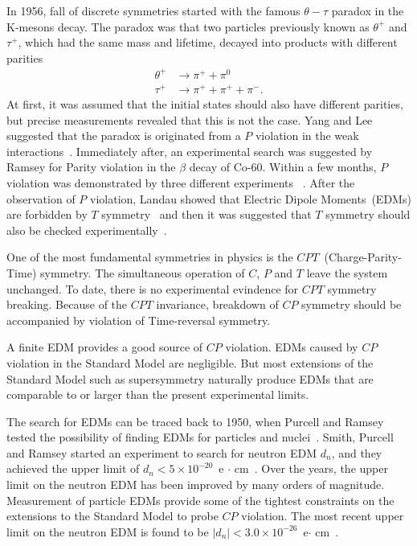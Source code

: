 In 1956, fall of discrete symmetries started with the famous
$\theta-\tau$ paradox in the K-mesons decay. The paradox was that two
particles previously known as $\theta^+$ and $\tau^+$, which had the
same mass and lifetime, decayed into products with different parities
\begin{equation}
  \begin{split}
    \theta^+ &\rightarrow \pi^+ + \pi^0 \\
    \tau^+ &\rightarrow \pi^+ + \pi^+ + \pi^-.
  \end{split}
\end{equation}
At first, it was assumed that the initial states should also have
different parities, but precise measurements revealed that this is not
the case. Yang and Lee suggested that the paradox is originated from a
$P$ violation in the weak
interactions~\cite{lee1957parity}. Immediately after, an experimental
search was suggested by Ramsey for Parity violation in the $\beta$
decay of Co-60. Within a few months, $P$ violation was demonstrated by
three different experiments
~\cite{PhysRev.105.1413,PhysRev.105.1415,friedman1957nuclear}. After
the observation of $P$ violation, Landau showed that Electric Dipole
Moments~(EDMs) are forbidden by $T$
symmetry~\cite{landau1957conservation} and then it was suggested that
$T$ symmetry should also be checked
experimentally~\cite{PhysRev.106.517}.

One of the most fundamental symmetries in physics is the
$CPT$~(Charge-Parity-Time) symmetry. The simultaneous operation of
$C$, $P$ and $T$ leave the system unchanged. To date, there is no
experimental evindence for $CPT$ symmetry breaking.  Because of the
$CPT$ invariance, breakdown of $CP$ symmetry should be accompanied by
violation of Time-reversal symmetry. 

A finite EDM provides a good source of $CP$ violation. EDMs caused by
$CP$ violation in the Standard Model are negligible. But most
extensions of the Standard Model such as supersymmetry naturally
produce EDMs that are comparable to or larger than the present
experimental limits.

The search for EDMs can be traced back to 1950, when Purcell and
Ramsey tested the possibility of finding EDMs for particles and
nuclei~\cite{PhysRev.78.807}. Smith, Purcell and Ramsey started an
experiment to search for neutron EDM $d_n$, and they achieved the
upper limit of $d_n < 5 \times 10^{-20}$~e $\cdot$
cm~\cite{smith1957experimental}.  Over the years, the upper limit on
the neutron EDM has been improved by many orders of
magnitude. Measurement of particle EDMs provide some of the tightest
constraints on the extensions to the Standard Model to probe $CP$
violation. The most recent upper limit on the neutron EDM is found to
be $\vert d_n\vert < 3.0 \times 10^{-26} $~e$\cdot$
cm~\cite{pendlebury2015revised}.



